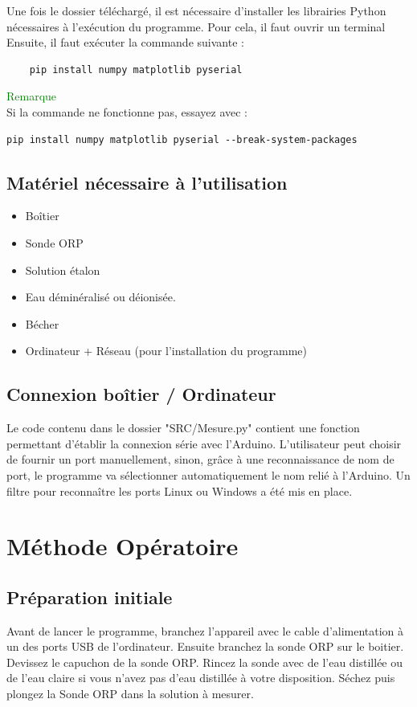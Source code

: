 \documentclass{ipgplicence}
\begin{document}
Une fois le dossier téléchargé, il est nécessaire d’installer les librairies Python nécessaires à l’exécution du programme.
Pour cela, il faut ouvrir un terminal Ensuite, il faut exécuter la commande suivante :
\begin{verbatim}
    pip install numpy matplotlib pyserial
\end{verbatim}

\begin{tcolorbox}[colback=gray!20, colframe=gray]
{\Large\textcolor{green}{Remarque}\\}
Si la commande ne fonctionne pas, essayez avec :\\
\begin{verbatim}
pip install numpy matplotlib pyserial --break-system-packages
\end{verbatim}
\end{tcolorbox}

\subsection{Matériel nécessaire à l'utilisation}

\begin{itemize}
    \item Boîtier
    \item Sonde ORP
    \item Solution étalon 
    \item Eau déminéralisé ou déionisée. 
    \item Bécher 
    \item Ordinateur + Réseau (pour l'installation du programme)
\end{itemize}
\newpage
\subsection{Connexion boîtier / Ordinateur}
Le code contenu dans le dossier "SRC/Mesure.py"  contient une fonction permettant d'établir la connexion série avec l'Arduino. L'utilisateur
peut choisir de fournir un port manuellement, sinon, grâce à une reconnaissance de nom de port, 
le programme va sélectionner automatiquement le nom relié à l'Arduino. 
Un filtre pour reconnaître les ports Linux ou Windows a été mis en place.


\section{Méthode Opératoire}
\subsection{Préparation initiale}
Avant de lancer le programme, branchez l'appareil avec le cable d’alimentation à un des ports USB
de l’ordinateur. Ensuite branchez la sonde ORP sur le boitier. Devissez le capuchon de la
sonde ORP. Rincez la sonde avec de l’eau distillée ou de l’eau claire si vous n’avez pas d’eau distillée
à votre disposition. Séchez puis plongez la Sonde ORP dans la solution à mesurer.
\end{document}
